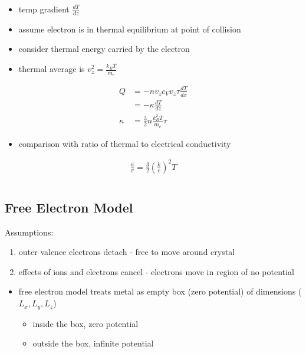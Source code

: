 \documentclass[a4paper,11pt,normalem]{article}
\begin{document}
\begin{enumerate}
\begin{itemize}
            \item temp gradient \(\frac{dT}{dz}\)
            \item assume electron is in thermal equilibrium at point of collision
            \item consider thermal energy carried by the electron
            \item thermal average is \(v_z^2 = \frac{k_BT}{m_e}\)
        \end{itemize}
        \begin{align*}
            Q &= -nv_z c_V v_z\tau \frac{dT}{dx} \\
              &= -\kappa \frac{dT}{dz} \\
            \kappa &= \frac{3}{2}n\frac{k_B^2T}{m_e}\tau
       \end{align*}
\end{enumerate}

\begin{itemize}
    \item comparison with ratio of thermal to electrical conductivity
\end{itemize}
\begin{align*}
    \frac{\kappa}{\sigma} = \frac{3}{2}\left(\frac{k}{e}\right)^2T
\end{align*}

\section{}
\subsection{Free Electron Model}

Assumptions:
\begin{enumerate}
    \item outer valence electrons detach - free to move around crystal
    \item effects of ions and electrons cancel - electrons move in region of no potential
\end{enumerate}
\begin{itemize}
    \item free electron model treats metal as empty box (zero potential) of dimensions (\(L_x,L_y,L_z\))
        \begin{itemize}
            \item inside the box, zero potential
            \item outside the box, infinite potential
        \end{itemize}
\end{itemize}
\end{document}
